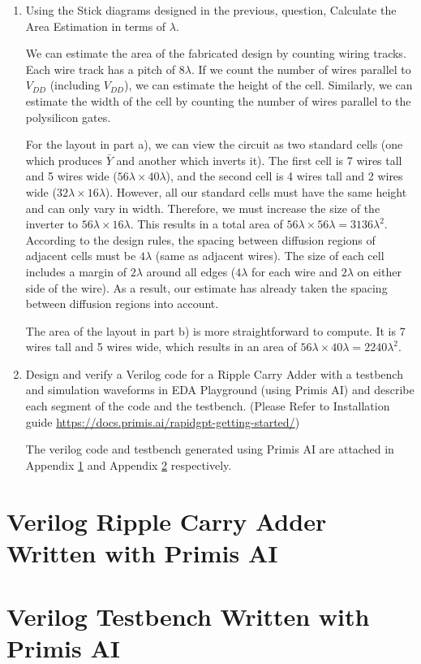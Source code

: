 \documentclass[fleqn]{article}
\begin{document}
\begin{enumerate}
		\item Using the Stick diagrams designed in the previous, question, Calculate the Area Estimation in terms of $\lambda$.
			
		We can estimate the area of the fabricated design by counting wiring tracks. Each wire track has a pitch of $8\lambda$. If we count the number of wires parallel to $V_{DD}$ (including $V_{DD}$), we can estimate the height of the cell. Similarly, we can estimate the width of the cell by counting the number of wires parallel to the polysilicon gates.
		
		For the layout in part a), we can view the circuit as two standard cells (one which produces $\bar{Y}$ and another which inverts it). The first cell is 7 wires tall and 5 wires wide ($56 \lambda \times 40 \lambda$), and the second cell is 4 wires tall and 2 wires wide ($32 \lambda \times 16 \lambda$). However, all our standard cells must have the same height and can only vary in width. Therefore, we must increase the size of the inverter to $56 \lambda \times 16 \lambda$. This results in a total area of $56 \lambda \times 56 \lambda = 3136 \lambda^2$. According to the design rules, the spacing between diffusion regions of adjacent cells must be $4\lambda$ (same as adjacent wires). The size of each cell includes a margin of $2\lambda$ around all edges ($4\lambda$ for each wire and $2\lambda$ on either side of the wire). As a result, our estimate has already taken the spacing between diffusion regions into account.
		
		The area of the layout in part b) is more straightforward to compute. It is 7 wires tall and 5 wires wide, which results in an area of $56 \lambda \times 40 \lambda = 2240\lambda^2$.
		 
		 \item Design and verify a Verilog code for a Ripple Carry Adder with a testbench and simulation waveforms in EDA Playground (using Primis AI) and describe each segment of the code and the testbench. (Please Refer to Installation guide \url{https://docs.primis.ai/rapidgpt-getting-started/})
		 
		 The verilog code and testbench generated using Primis AI are attached in Appendix \ref{appendix::ripple_carry_adder} and Appendix \ref{appendix::testbench} respectively. 
		 
	\end{enumerate}
	
	\pagebreak
	\appendix
	\section{Verilog Ripple Carry Adder Written with Primis AI}
	\label{appendix::ripple_carry_adder}
	
	
	\pagebreak
	\section{Verilog Testbench Written with Primis AI}
	\label{appendix::testbench}
	
\end{document}
